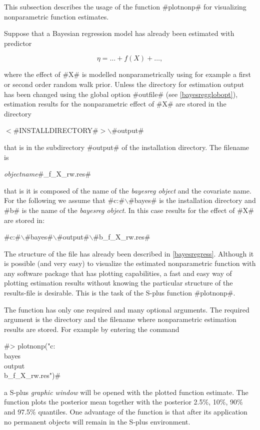 This subsection describes the usage of the function #plotnonp# for
visualizing nonparametric function estimates.

Suppose that a Bayesian regression model has already been
estimated with predictor

$$
\eta = \dots + f(X) + \dots,
$$

where the effect of #X# is modelled nonparametrically using for
example a first or second order random walk prior. Unless the
directory for estimation output has been changed using the global
option #outfile# (see \autoref{bayesregglobopt}), estimation
results for the nonparametric effect of #X# are stored in the
directory

$<$#INSTALLDIRECTORY#$>$$\backslash$#output#

that is in the subdirectory #output# of the installation
directory. The filename is

{\em objectname}#_f_X_rw.res#

that is it is composed of the name of the {\em bayesreg object}
and the covariate name. For the following we assume that
#c:#$\backslash$#bayes# is the installation directory and #b# is
the name of the {\em bayesreg object}. In this case results for
the effect of #X# are stored in:

#c:#$\backslash$#bayes#$\backslash$#output#$\backslash$#b_f_X_rw.res#

The structure of the file has already been described in
\autoref{bayesregress}. Although it is possible (and very easy) to
visualize the estimated nonparametric function with any software
package that has plotting capabilities, a fast and easy way of
plotting estimation results without knowing the particular
structure of the results-file is desirable. This is the task of
the S-plus function #plotnonp#.

The function has only one required and many optional arguments.
The required argument is the directory and the filename where
nonparametric estimation results are stored. For example by
entering the command

#> plotnonp("c:\\bayes\\output\\b_f_X_rw.res")#

a S-plus {\em graphic window} will be opened with the plotted
function estimate. The function plots the posterior mean together
with the posterior 2.5\%, 10\%, 90\% and 97.5\% quantiles. One
advantage of the function is that after its application no
permanent objects will remain in the S-plus environment.

